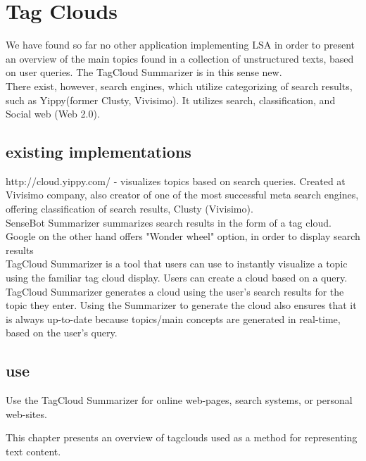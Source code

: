 \chapter{Tag Clouds}
\label{sec:semannot}


We have found so far no other application implementing LSA in order to present an overview of the main topics found in a collection of unstructured texts, based on user queries. The TagCloud Summarizer is in this sense new.\\

There exist, however, search engines, which utilize categorizing of search results, such as Yippy(former Clusty, Vivisimo). It utilizes search, classification, and Social web (Web 2.0).
\section{existing implementations}
http://cloud.yippy.com/  - visualizes topics based on search queries. Created at Vivisimo company, also creator of one of the most successful meta search engines, offering classification of search results, Clusty (Vivisimo). \\

SenseBot Summarizer summarizes search results in the form of a tag cloud.\\

Google on the other hand offers "Wonder wheel" option, in order to display search results \\ 

TagCloud Summarizer is a tool that users can use to instantly visualize a topic using the familiar tag cloud display. Users can create a cloud based on a query.\\

TagCloud Summarizer generates a cloud using the user's search results for the topic they enter. Using the Summarizer to generate the cloud also ensures that it is always up-to-date because topics/main concepts are generated in real-time, based on the user's query.\\

\section{use}
Use the TagCloud Summarizer for online web-pages, search systems, or personal web-sites.\\

\begin{summary}
This chapter presents an overview of tagclouds used as a method for representing text content.
\end{summary}


